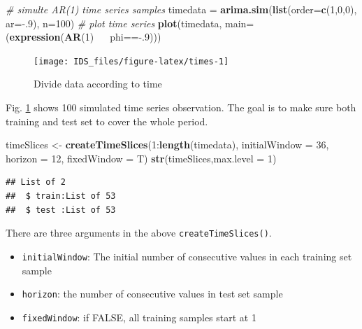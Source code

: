 \documentclass[12pt,]{krantz}
\newenvironment{Shaded}{\begin{snugshade}}{\end{snugshade}}
\newcommand{\KeywordTok}[1]{\textcolor[rgb]{0.13,0.29,0.53}{\textbf{{#1}}}}
\newcommand{\DataTypeTok}[1]{\textcolor[rgb]{0.13,0.29,0.53}{{#1}}}
\newcommand{\DecValTok}[1]{\textcolor[rgb]{0.00,0.00,0.81}{{#1}}}
\newcommand{\StringTok}[1]{\textcolor[rgb]{0.31,0.60,0.02}{{#1}}}
\newcommand{\CommentTok}[1]{\textcolor[rgb]{0.56,0.35,0.01}{\textit{{#1}}}}
\newcommand{\ErrorTok}[1]{\textcolor[rgb]{0.64,0.00,0.00}{\textbf{{#1}}}}
\newcommand{\NormalTok}[1]{{#1}}
\providecommand{\tightlist}{%
  \setlength{\itemsep}{0pt}\setlength{\parskip}{0pt}}
\theoremstyle{definition}
\theoremstyle{definition}
\theoremstyle{remark}
\begin{document}
\begin{Shaded}
\begin{Highlighting}[]
\CommentTok{# simulte AR(1) time series samples}
\NormalTok{timedata =}\StringTok{ }\KeywordTok{arima.sim}\NormalTok{(}\KeywordTok{list}\NormalTok{(}\DataTypeTok{order=}\KeywordTok{c}\NormalTok{(}\DecValTok{1}\NormalTok{,}\DecValTok{0}\NormalTok{,}\DecValTok{0}\NormalTok{), }\DataTypeTok{ar=}\NormalTok{-.}\DecValTok{9}\NormalTok{), }\DataTypeTok{n=}\DecValTok{100}\NormalTok{)}
\CommentTok{# plot time series}
\KeywordTok{plot}\NormalTok{(timedata, }\DataTypeTok{main=}\NormalTok{(}\KeywordTok{expression}\NormalTok{(}\KeywordTok{AR}\NormalTok{(}\DecValTok{1}\NormalTok{)~}\ErrorTok{~~}\NormalTok{phi==-.}\DecValTok{9}\NormalTok{)))     }
\end{Highlighting}
\end{Shaded}

\begin{figure}

{\centering \texttt{[image: IDS\_files/figure-latex/times-1]} 

}

\caption{Divide data according to time}\label{fig:times}
\end{figure}

Fig. \ref{fig:times} shows 100 simulated time series observation. The
goal is to make sure both training and test set to cover the whole
period.

\begin{Shaded}
\begin{Highlighting}[]
\NormalTok{timeSlices <-}\StringTok{ }\KeywordTok{createTimeSlices}\NormalTok{(}\DecValTok{1}\NormalTok{:}\KeywordTok{length}\NormalTok{(timedata), }
                   \DataTypeTok{initialWindow =} \DecValTok{36}\NormalTok{, }\DataTypeTok{horizon =} \DecValTok{12}\NormalTok{, }\DataTypeTok{fixedWindow =} \NormalTok{T)}
\KeywordTok{str}\NormalTok{(timeSlices,}\DataTypeTok{max.level =} \DecValTok{1}\NormalTok{)}
\end{Highlighting}
\end{Shaded}

\begin{verbatim}
## List of 2
##  $ train:List of 53
##  $ test :List of 53
\end{verbatim}

There are three arguments in the above \texttt{createTimeSlices()}.

\begin{itemize}
\tightlist
\item
  \texttt{initialWindow}: The initial number of consecutive values in
  each training set sample
\item
  \texttt{horizon}: the number of consecutive values in test set sample
\item
  \texttt{fixedWindow}: if FALSE, all training samples start at 1
\end{itemize}
\end{document}
